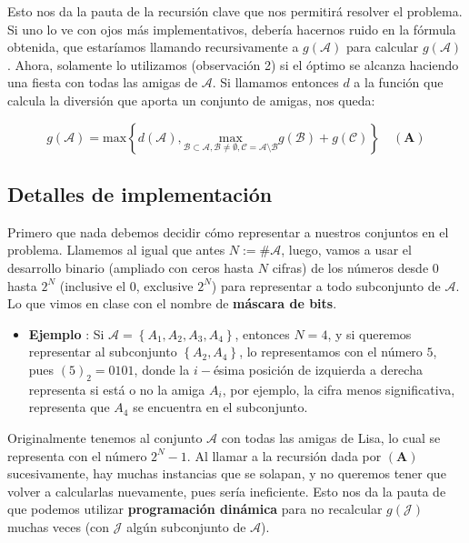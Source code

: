Esto nos da la pauta de la recursión clave que nos permitirá resolver el problema. Si uno lo ve con ojos más implementativos, debería hacernos ruido en la fórmula obtenida, que estaríamos llamando recursivamente a $g(\mathcal{A})$ para calcular $g(\mathcal{A})$. Ahora, solamente lo utilizamos (observación 2) si el óptimo se alcanza haciendo una fiesta con todas las amigas de $\mathcal{A}$. Si llamamos entonces $d$ a la función que calcula la diversión que aporta un conjunto de amigas, nos queda:

$$ \boxed{g(\mathcal{A}) =  \text{max} \left \{ d(\mathcal{A}),\underset{\mathcal{B} \subset \mathcal{A}, \mathcal{B} \neq \emptyset, \mathcal{C} = \mathcal{A} \setminus \mathcal{B}}{\text{max}} g(\mathcal{B}) + g(\mathcal{C}) \right \} } \quad  (\mathbf{A}) $$


\subsection*{Detalles de implementación}

Primero que nada debemos decidir cómo representar a nuestros conjuntos en el problema. Llamemos al igual que antes $ N := \# \mathcal{A}$, luego, vamos a usar el desarrollo binario (ampliado con ceros hasta $N$ cifras) de los números desde $0$ hasta $2^N$ (inclusive el $0$, exclusive $2^N$) para representar a todo subconjunto de $\mathcal{A}$. Lo que vimos en clase con el nombre de \textbf{máscara de bits}.

\begin{itemize}
	\item \textbf{Ejemplo} : Si $\mathcal{A} = \left \{ A_1, A_2, A_3, A_4 \right \}$, entonces $ N = 4$, y si queremos representar al subconjunto $ \left \{ A_2, A_4 \right \}$, lo representamos con el número $5$, pues $(5)_2 = 0101$, donde la $i-$ésima posición de izquierda a derecha representa si está o no la amiga $A_i$, por ejemplo, la cifra menos significativa, representa que $A_4$ se encuentra en el subconjunto.
\end{itemize}

Originalmente tenemos al conjunto $\mathcal{A}$ con todas las amigas de Lisa, lo cual se representa con el número $2^N-1$. Al llamar a la recursión dada por $(\mathbf{A})$ sucesivamente, hay muchas instancias que se solapan, y no queremos tener que volver a calcularlas nuevamente, pues sería ineficiente. Esto nos da la pauta de que podemos utilizar \textbf{programación dinámica} para no recalcular $g(\mathcal{J})$ muchas veces (con $\mathcal{J}$ algún subconjunto de $\mathcal{A}$).


